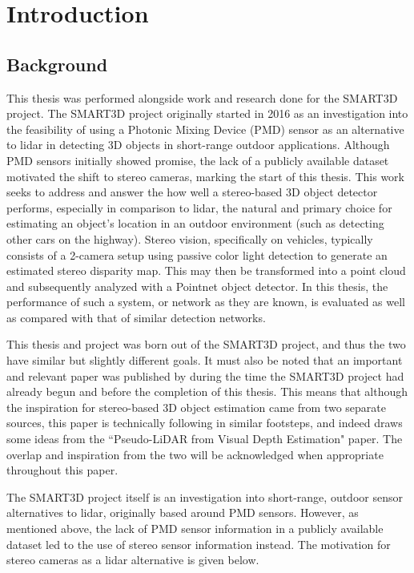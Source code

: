 \section{Introduction} %

\subsection{Background}
This thesis was performed alongside work and research done for the SMART3D project. The SMART3D project originally started in 2016 as an investigation into the feasibility of using a Photonic Mixing Device (PMD) sensor as an alternative to lidar in detecting 3D objects in short-range outdoor applications. Although PMD sensors initially showed promise, the lack of a publicly available dataset motivated the shift to stereo cameras, marking the start of this thesis. This work seeks to address and answer the how well a stereo-based 3D object detector performs, especially in comparison to lidar, the natural and primary choice for estimating an object's location in an outdoor environment (such as detecting other cars on the highway). Stereo vision, specifically on vehicles, typically consists of a 2-camera setup using passive color light detection to generate an estimated stereo disparity map. This may then be transformed into a point cloud and subsequently analyzed with a Pointnet object detector. In this thesis, the performance of such a system, or network as they are known, is evaluated as well as compared with that of similar detection networks. 

This thesis and project was born out of the SMART3D project, and thus the two have similar but slightly different goals. It must also be noted that an important and relevant paper was published by \cite{wang_pseudo-lidar_2019} during the time the SMART3D project had already begun and before the completion of this thesis. This means that although the inspiration for stereo-based 3D object estimation came from two separate sources, this paper is technically following in similar footsteps, and indeed draws some ideas from the ``Pseudo-LiDAR from Visual Depth Estimation" paper. The overlap and inspiration from the two will be acknowledged when appropriate throughout this paper.

The SMART3D project itself is an investigation into short-range, outdoor sensor alternatives to lidar, originally based around PMD sensors. However, as mentioned above, the lack of PMD sensor information in a publicly available dataset led to the use of stereo sensor information instead. The motivation for stereo cameras as a lidar alternative is given below.

